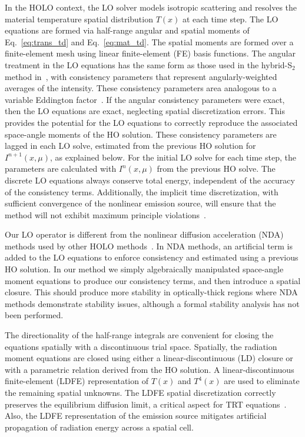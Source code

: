 In the HOLO context, the LO solver models isotropic scattering and
resolves the material temperature spatial distribution $T(x)$ at each time step.  The LO equations are formed via half-range 
angular and spatial moments of
Eq.~\eqref{eq:trans_td} and Eq.~\eqref{eq:mat_td}. 
The spatial moments are formed over a
finite-element mesh using linear finite-element (FE) basis functions.   The angular treatment in the LO equations has the same form as those
used in the hybrid-S$_2$ method in~\cite{wolters},  with consistency parameters that
represent angularly-weighted averages of the intensity. 
These consistency parameters
area analogous to a variable Eddington factor~\cite{chandrasekhar}.  If the angular consistency parameters were exact, then the LO
equations are exact, neglecting spatial discretization errors.  This provides the
potential for the LO equations to correctly reproduce the associated space-angle
moments of the HO solution. These consistency
parameters are lagged in each LO solve, estimated from the previous HO solution for
$I^{n+1}(x,\mu)$, as explained below. For the initial LO solve for each time step, the
parameters are calculated with $I^{n}(x,\mu)$ from the previous HO solve.  The discrete LO equations always conserve
total energy, independent of the accuracy of the consistency terms. 
Additionally, the
implicit time discretization, with sufficient convergence of the nonlinear emission
source, will ensure that the method will not exhibit maximum principle
violations~\cite{larsen_mpv}.

Our LO operator is different from the nonlinear
diffusion acceleration (NDA) methods used by other HOLO methods~\cite{rmc,park,willert}.  In
NDA methods, an artificial term is added to the LO equations to enforce consistency and estimated using a
previous HO solution.  In our method we simply algebraically 
manipulated space-angle moment equations to produce our consistency terms, and then
introduce a spatial closure. This should produce more
stability in optically-thick regions where NDA methods demonstrate stability issues,
although a formal stability analysis has not been performed.

The directionality of the half-range integrals are convenient for closing the equations
spatially with a discontinuous trial space.  Spatially, the radiation moment
equations are closed using either a linear-discontinuous (LD) closure or with a
parametric relation derived from the HO solution.  A linear-discontinuous
finite-element (LDFE) representation of $T(x)$
and $T^4(x)$ are used to eliminate the remaining spatial unknowns.
The LDFE spatial discretization correctly preserves the equilibrium diffusion limit, a
critical aspect for TRT equations~\cite{larsen_edl,morel_newton}. Also, the LDFE
representation of the emission source mitigates artificial propagation of radiation
energy across a spatial cell.

